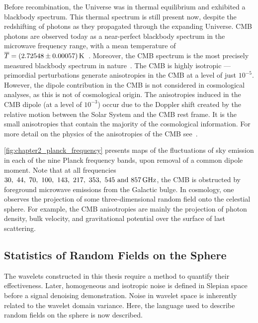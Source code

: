 Before recombination, the Universe was in thermal equilibrium and exhibited a blackbody spectrum.
This thermal spectrum is still present now, despite the redshifting of photons as they propagated through the expanding Universe.
CMB photons are observed today as a near-perfect blackbody spectrum in the microwave frequency range, with a mean temperature of \(\mean{T} = \SI{2.72548(0.00057)}{\kelvin}\)~\cite{Fixsen2009}.
Moreover, the CMB spectrum is the most precisely measured blackbody spectrum in nature~\cite{White1994}.
The CMB is highly isotropic --- primordial perturbations generate anisotropies in the CMB at a level of just \(10^{-5}\).
However, the dipole contribution in the CMB is not considered in cosmological analyses, as this is not of cosmological origin.
The anisotropies induced in the CMB dipole (at a level of \(10^{-3}\)) occur due to the Doppler shift created by the relative motion between the Solar System and the CMB rest frame.
It is the small anisotropies that contain the majority of the cosmological information.
For more detail on the physics of the anisotropies of the CMB see~\cite{Bucher2015}.

\cref{fig:chapter2_planck_frequency} presents maps of the fluctuations of sky emission in each of the nine Planck frequency bands, upon removal of a common dipole moment.
Note that at all frequencies \(\qtylist[list-units=single]{30;44;70;100;143;217;353;545;857}{\giga\hertz}\), the CMB is obstructed by foreground microwave emissions from the Galactic bulge.
In cosmology, one observes the projection of some three-dimensional random field onto the celestial sphere.
For example, the CMB anisotropies are mainly the projection of photon density, bulk velocity, and gravitational potential over the surface of last scattering.



\subsection{Statistics of Random Fields on the Sphere}\label{sec:chapter2_statistics_random_fields_sphere}

The wavelets constructed in this thesis require a method to quantify their effectiveness.
Later, homogeneous and isotropic noise is defined in Slepian space before a signal denoising demonstration.
Noise in wavelet space is inherently related to the wavelet domain variance.
Here, the language used to describe random fields on the sphere is now described.

